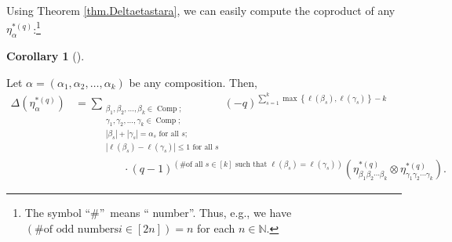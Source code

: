 \documentclass[numbers=enddot,12pt,final,onecolumn,notitlepage]{scrartcl}%
\theoremstyle{definition}
\newtheorem{coro}[theo]{Corollary}
\newenvironment{corollary}[1][]
{\begin{coro}[#1]\begin{leftbar}}
{\end{leftbar}\end{coro}}
\let\sumnonlimits\sum
\renewcommand{\sum}{\sumnonlimits\limits}
\begin{document}
Using Theorem \ref{thm.Deltaetastara}, we can easily compute the coproduct of
any $\eta_{\alpha}^{\ast\left(  q\right)  }$:\footnote{The symbol
\textquotedblleft\#\textquotedblright\ means \textquotedblleft
number\textquotedblright. Thus, e.g., we have $\left(  \text{\# of odd numbers
}i\in\left[  2n\right]  \right)  =n$ for each $n\in\mathbb{N}$.}

\begin{corollary}
\label{cor.Deltaetastaral}Let $\alpha=\left(  \alpha_{1},\alpha_{2}%
,\ldots,\alpha_{k}\right)  $ be any composition. Then,%
\begin{align*}
\Delta\left(  \eta_{\alpha}^{\ast\left(  q\right)  }\right)   &
=\sum_{\substack{\beta_{1},\beta_{2},\ldots,\beta_{k}\in\operatorname*{Comp}%
;\\\gamma_{1},\gamma_{2},\ldots,\gamma_{k}\in\operatorname*{Comp};\\\left\vert
\beta_{s}\right\vert +\left\vert \gamma_{s}\right\vert =\alpha_{s}\text{ for
all }s;\\\left\vert \ell\left(  \beta_{s}\right)  -\ell\left(  \gamma
_{s}\right)  \right\vert \leq1\text{ for all }s}}\left(  -q\right)
^{\sum_{s=1}^{k}\max\left\{  \ell\left(  \beta_{s}\right)  ,\ell\left(
\gamma_{s}\right)  \right\}  -k}\\
&  \ \ \ \ \ \ \ \ \ \ \ \ \ \ \ \ \ \ \ \ \cdot\left(  q-1\right)  ^{\left(
\text{\# of all }s\in\left[  k\right]  \text{ such that }\ell\left(  \beta
_{s}\right)  =\ell\left(  \gamma_{s}\right)  \right)  }\left(  \eta_{\beta
_{1}\beta_{2}\cdots\beta_{k}}^{\ast\left(  q\right)  }\otimes\eta_{\gamma
_{1}\gamma_{2}\cdots\gamma_{k}}^{\ast\left(  q\right)  }\right)  .
\end{align*}

\end{corollary}
\end{document}
